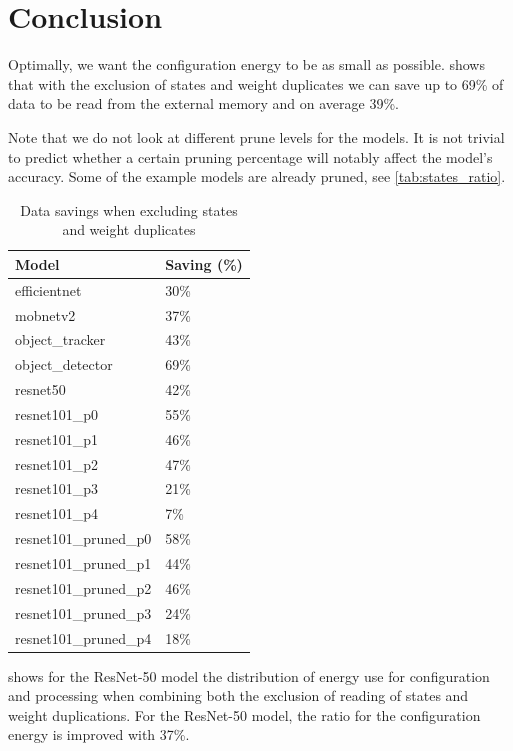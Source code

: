 \section{Conclusion}
Optimally, we want the configuration energy to be as small as possible.
 shows that with the exclusion of states and weight duplicates we can save up to 69\% of data to be read from the external memory and on average 39\%.

Note that we do not look at different prune levels for the models.
It is not trivial to predict whether a certain pruning percentage will notably affect the model's accuracy.
Some of the example models are already pruned, see \cref{tab:states_ratio}.

\begin{table}[hbtp]
\centering
\begin{tabular}{@{}ll@{}}
\toprule
\textbf{Model}          & \textbf{Saving (\%)} \\ \midrule
efficientnet            & 30\%                 \\
mobnetv2                & 37\%                 \\
object\_tracker         & 43\%                 \\
object\_detector        & 69\%                 \\
resnet50                & 42\%                 \\
resnet101\_p0           & 55\%                 \\
resnet101\_p1           & 46\%                 \\
resnet101\_p2           & 47\%                 \\
resnet101\_p3           & 21\%                 \\
resnet101\_p4           & 7\%                  \\
resnet101\_pruned\_p0   & 58\%                 \\
resnet101\_pruned\_p1   & 44\%                 \\
resnet101\_pruned\_p2   & 46\%                 \\
resnet101\_pruned\_p3   & 24\%                 \\
resnet101\_pruned\_p4   & 18\%                 \\ \bottomrule
\end{tabular}
\caption{Data savings when excluding states and weight duplicates}
\label{tab:savings}
\end{table}

 shows for the ResNet-50 model the distribution of energy use for configuration and processing when combining both the exclusion of reading of states and weight duplications.
For the ResNet-50 model, the ratio for the configuration energy is improved with 37\%.

